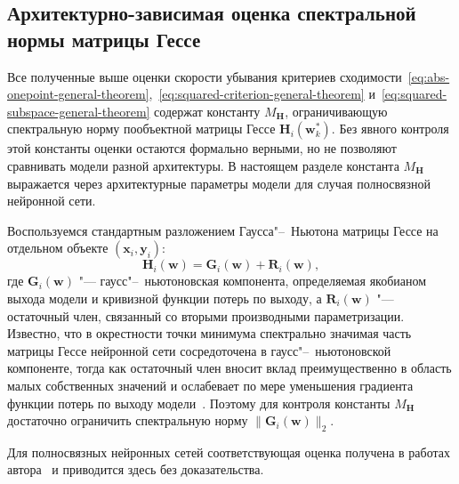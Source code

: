 \subsection{Архитектурно-зависимая оценка спектральной нормы матрицы Гессе}\label{subsec:hessian-bound}

Все полученные выше оценки скорости убывания критериев сходимости~\eqref{eq:abs-onepoint-general-theorem},~\eqref{eq:squared-criterion-general-theorem} и~\eqref{eq:squared-subspace-general-theorem} содержат константу $M_{\mathbf H}$, ограничивающую спектральную норму пообъектной матрицы Гессе $\mathbf H_i(\mathbf w_k^*)$. Без явного контроля этой константы оценки остаются формально верными, но не позволяют сравнивать модели разной архитектуры. В настоящем разделе константа $M_{\mathbf H}$ выражается через архитектурные параметры модели для случая полносвязной нейронной сети.

Воспользуемся стандартным разложением Гаусса"--~Ньютона матрицы Гессе на отдельном объекте $(\mathbf x_i, \mathbf y_i)$:
\begin{equation}
    \label{eq:gauss-newton-decomposition}
    \mathbf H_i(\mathbf w) = \mathbf G_i(\mathbf w) + \mathbf R_i(\mathbf w),
\end{equation}
где $\mathbf G_i(\mathbf w)$ "--- гаусс"--~ньютоновская компонента, определяемая якобианом выхода модели и кривизной функции потерь по выходу, а $\mathbf R_i(\mathbf w)$ "--- остаточный член, связанный со вторыми производными параметризации. Известно, что в окрестности точки минимума спектрально значимая часть матрицы Гессе нейронной сети сосредоточена в гаусс"--~ньютоновской компоненте, тогда как остаточный член вносит вклад преимущественно в область малых собственных значений и ослабевает по мере уменьшения градиента функции потерь по выходу модели~\cite{sagun2017hessian,ghorbani2019investigation,papyan2020traces}. Поэтому для контроля константы $M_{\mathbf H}$ достаточно ограничить спектральную норму $\|\mathbf G_i(\mathbf w)\|_2$.

Для полносвязных нейронных сетей соответствующая оценка получена в работах автора~\cite{kiselev2025ssdlb,meshkov2024convnets} и приводится здесь без доказательства.

